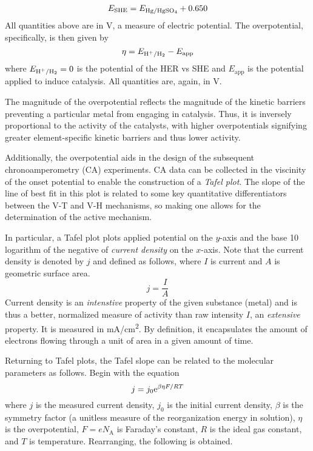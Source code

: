 \documentclass[../labs.tex]{subfiles}
\begin{document}
\begin{equation}
    E_\text{SHE} = E_{\ce{Hg/HgSO4}}+0.650
\end{equation}
All quantities above are in \si{\volt}, a measure of electric potential. The overpotential, specifically, is then given by
\begin{equation}
    \eta = E_{\ce{H+/H2}}-E_\text{app}
\end{equation}
where $E_{\ce{H+/H2}}=0$ is the potential of the HER vs SHE and $E_\text{app}$ is the potential applied to induce catalysis. All quantities are, again, in \si{\volt}.\par
The magnitude of the overpotential reflects the magnitude of the kinetic barriers preventing a particular metal from engaging in catalysis. Thus, it is inversely proportional to the activity of the catalysts, with higher overpotentials signifying greater element-specific kinetic barriers and thus lower activity.\par
Additionally, the overpotential aids in the design of the subsequent chronoamperometry (CA) experiments. CA data can be collected in the viscinity of the onset potential to enable the construction of a \emph{Tafel plot}. The slope of the line of best fit in this plot is related to some key quantitative differentiators between the V-T and V-H mechanisms, so making one allows for the determination of the active mechanism.\par
In particular, a Tafel plot plots applied potential on the $y$-axis and the base 10 logarithm of the negative of \emph{current density} on the $x$-axis. Note that the current density is denoted by $j$ and defined as follows, where $I$ is current and $A$ is geometric surface area.
\begin{equation}
    j = \frac{I}{A}
\end{equation}
Current density is an \emph{intenstive} property of the given substance (metal) and is thus a better, normalized measure of activity than raw intensity $I$, an \emph{extensive} property. It is measured in \si[per-mode=symbol]{\milli\ampere\per\centi\meter\squared}. By definition, it encapsulates the amount of electrons flowing through a unit of area in a given amount of time.\par
Returning to Tafel plots, the Tafel slope can be related to the molecular parameters as follows.\supercite{bib:LabManual2} Begin with the equation
\begin{equation}
    j = j_0\e[\beta\eta F/RT]
\end{equation}
where $j$ is the measured current density, $j_0$ is the initial current density, $\beta$ is the symmetry factor (a unitless measure of the reorganization energy in solution), $\eta$ is the overpotential, $F=eN_\text{A}$ is Faraday's constant, $R$ is the ideal gas constant, and $T$ is temperature. Rearranging, the following is obtained.
\end{document}
